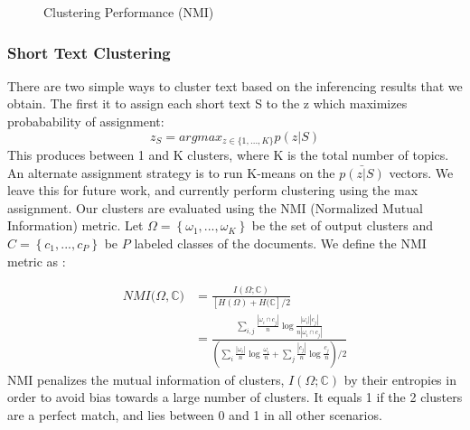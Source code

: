 \documentclass{sig-alternate-05-2015}
\begin{document}
\begin{figure}[t]
    \centering
    \caption{Clustering Performance (NMI)}
\end{figure}


\subsubsection{Short Text Clustering} 
There are two simple ways to cluster text based on the inferencing results that we obtain. The first it to assign each short text S to the z which maximizes probabability of assignment:
$$z_{S} = argmax_{z \in \{1, ... ,K\}}p(z|S)$$
This produces between 1 and K clusters, where K is the total number of topics. An alternate assignment strategy is to run K-means on the $\bar{p(z|S)}$ vectors. We leave this for future work, and currently perform clustering using the max assignment. Our clusters are evaluated using the NMI (Normalized Mutual Information) metric. Let $\Omega = \left\lbrace \omega_1, ..., \omega_K \right\rbrace$ be the set of output clusters and $C = \left\lbrace c_1, ..., c_P \right\rbrace$ be $P$ labeled classes of the documents. We define the NMI metric as :

\begin{align*}
NMI(\Omega, \mathbb{C)} &= \frac{I(\Omega ; \mathbb{C})}{\left[ H(\Omega) + H (\mathbb{C} \right] /2} \\[5pt]
&= \frac{ \sum_{i, j} \frac{| \omega_i \cap c_j|}{n} \log \frac{|\omega_i| |c_j|}
{n |\omega_i \cap c_j|} }{(\sum_i \frac{|\omega_i|}{n} \log \frac{\omega_i}{n} + \sum_j \frac{|c_j|}{n} \log \frac{c_j}{n})/2}
\end{align*}
NMI penalizes the mutual information of clusters, $I(\Omega ; \mathbb{C})$ by their entropies in order to avoid bias towards a large number of clusters. It equals 1 if the 2 clusters are a perfect match, and lies between 0 and 1 in all other scenarios.
\end{document}
